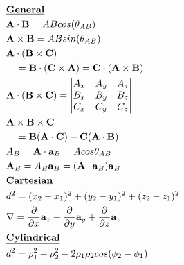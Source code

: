 \documentclass[10pt,letterpaper]{report}
\begin{document}
  \fancyhead{} %
  \large 
  
  \begin{equation*}
    \begin{split} %
      &\text{\underline{\textbf{General}}} \\
      &\textbf{A}\cdot \textbf{B} = ABcos(\theta_{AB}) \\ %
      &\textbf{A} \times \textbf{B} = ABsin(\theta_{AB}) \\ %
      &\textbf{A} \cdot (\textbf{B} \times \textbf{C}) \\ %
      & \quad = \textbf{B} \cdot (\textbf{C} \times \textbf{A}) = \textbf{C} \cdot (\textbf{A} \times \textbf{B} )  \\
      &\textbf{A} \cdot (\textbf{B} \times \textbf{C}) = 
        \begin{vmatrix}  
          A_x & A_y & A_z \\
          B_x & B_y & B_z \\
          C_x & C_y & C_z
        \end{vmatrix} \\
      &\textbf{A} \times \textbf{B} \times \textbf{C} \\ %
      &\quad = \textbf{B}(\textbf{A} \cdot \textbf{C}) - \textbf{C}(\textbf{A} \cdot \textbf{B}) \\
      &A_B = \textbf{A} \cdot \textbf{a}_B = Acos\theta_{AB} \\ %
      &\textbf{A}_B = A_B\textbf{a}_B = (\textbf{A} \cdot \textbf{a}_B)\textbf{a}_B \\ %
      &\text{\underline{\textbf{Cartesian}}} \\
      &d^2 = (x_2 - x_1)^2 + (y_2 - y_1)^2 + (z_2 - z_1)^2 \\ %
      &\nabla = \frac{\partial}{\partial x}\textbf{a}_x +  \frac{\partial}{\partial y}\textbf{a}_y + \frac{\partial}{\partial z}\textbf{a}_z \\
      &\text{\underline{\textbf{Cylindrical}}} \\
      &d^2 = \rho_1^2 + \rho_2^2 -2\rho_1\rho_2 cos( \phi_2 - \phi_1 ) \\ %

\end{split}
\end{equation*}
\end{document}
